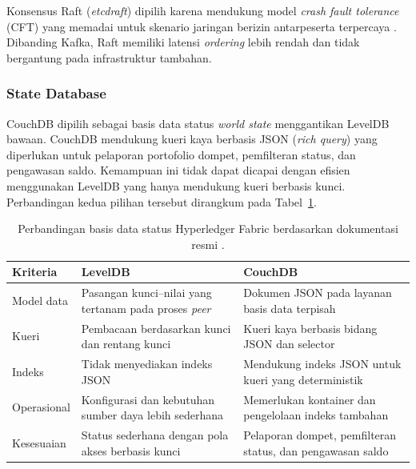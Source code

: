 Konsensus Raft (\textit{etcdraft}) dipilih karena mendukung model \textit{crash
fault tolerance} (CFT) yang memadai untuk skenario jaringan berizin
antarpeserta terpercaya \cite{androulaki2018}. Dibanding Kafka, Raft memiliki
latensi \textit{ordering} lebih rendah dan tidak bergantung pada infrastruktur
tambahan.

\subsubsection{State Database}

CouchDB dipilih sebagai basis data status \textit{world state} menggantikan
LevelDB bawaan. CouchDB mendukung kueri kaya berbasis JSON (\textit{rich query})
yang diperlukan untuk pelaporan portofolio dompet, pemfilteran status, dan
pengawasan saldo. Kemampuan ini tidak dapat dicapai dengan efisien menggunakan
LevelDB yang hanya mendukung kueri berbasis kunci. Perbandingan kedua pilihan
tersebut dirangkum pada Tabel~\ref{tab:state-database}.

\begin{table}[H]
    \caption[Perbandingan basis data status Hyperledger Fabric berdasarkan dokumentasi resmi.]{Perbandingan basis data status Hyperledger Fabric berdasarkan dokumentasi resmi \cite{hyperledger_fabric_couchdb}.}
    \label{tab:state-database}
    \centering
    \small
    \begin{tabular}{@{}p{2.8cm}p{4.5cm}p{4.5cm}@{}}
        \toprule
        \textbf{Kriteria} & \textbf{LevelDB} & \textbf{CouchDB} \\
        \midrule
        Model data & Pasangan kunci--nilai yang tertanam pada proses \textit{peer} & Dokumen JSON pada layanan basis data terpisah \\
        Kueri & Pembacaan berdasarkan kunci dan rentang kunci & Kueri kaya berbasis bidang JSON dan selector \\
        Indeks & Tidak menyediakan indeks JSON & Mendukung indeks JSON untuk kueri yang deterministik \\
        Operasional & Konfigurasi dan kebutuhan sumber daya lebih sederhana & Memerlukan kontainer dan pengelolaan indeks tambahan \\
        Kesesuaian & Status sederhana dengan pola akses berbasis kunci & Pelaporan dompet, pemfilteran status, dan pengawasan saldo \\
        \bottomrule
    \end{tabular}
\end{table}

